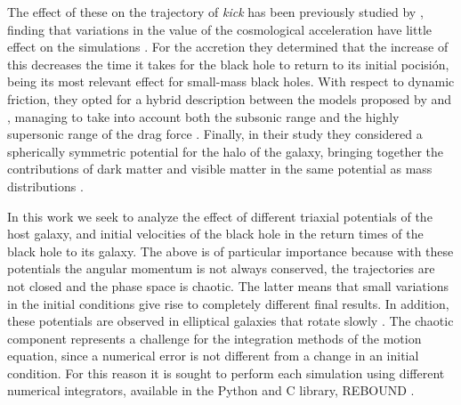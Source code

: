 	The effect of these on the trajectory of \textit{kick} has been previously studied by \citeauthor{choksi2017recoiling}, finding that variations in the value of the cosmological acceleration have little effect on the simulations \cite{choksi2017recoiling}. For the accretion they determined that the increase of this decreases the time it takes for the black hole to return to its initial pocisión, being its most relevant effect for small-mass black holes. With respect to dynamic friction, they opted for a hybrid description between the models proposed by \citeauthor{ostriker1999dynamical} and \citeauthor{escala2005role}, managing to take into account both the subsonic range and the highly supersonic range of the drag force \cite{ostriker1999dynamical, escala2005role}. Finally, in their study they considered a spherically symmetric potential for the halo of the galaxy, bringing together the contributions of dark matter and visible matter in the same potential as mass distributions \cite{choksi2017recoiling}.
	
	In this work we seek to analyze the effect of different triaxial potentials of the host galaxy, and initial velocities of the black hole in the return times of the black hole to its galaxy. The above is of particular importance because with these potentials the angular momentum is not always conserved, the trajectories are not closed and the phase space is chaotic. The latter means that small variations in the initial conditions give rise to completely different final results. In addition, these potentials are observed in elliptical galaxies that rotate slowly \cite{buote2002chandra, binney1978elliptical}. The chaotic component represents a challenge for the integration methods of the motion equation, since a numerical error is not different from a change in an initial condition. For this reason it is sought to perform each simulation using different numerical integrators, available in the Python and C library, REBOUND \cite{larson2017modeling}.
	
